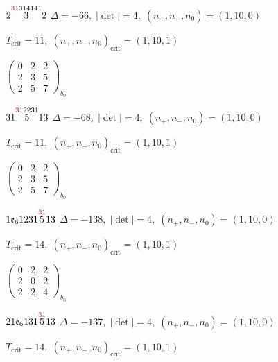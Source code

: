 \documentclass[10pt]{article}
\begin{document}
\smallskip

$2\overset{\textcolor{red}{3}1314141}{3}2$ \quad $\Delta=-66,\; |\det|=4,\; (n_+,n_-,n_0)=(1,10,0)$

\hspace{1em}$T_{\text{crit}}=11,\; (n_+,n_-,n_0)_{\text{crit}}=(1,10,1)$

\hspace{2em}$\left(\begin{smallmatrix}0 & 2 & 2 \\ 2 & 3 & 5 \\ 2 & 5 & 7\end{smallmatrix}\right)_{\!b_0}$

\smallskip

$31\overset{\textcolor{red}{3}12231}{5}13$ \quad $\Delta=-68,\; |\det|=4,\; (n_+,n_-,n_0)=(1,10,0)$

\hspace{1em}$T_{\text{crit}}=11,\; (n_+,n_-,n_0)_{\text{crit}}=(1,10,1)$

\hspace{2em}$\left(\begin{smallmatrix}0 & 2 & 2 \\ 2 & 3 & 5 \\ 2 & 5 & 7\end{smallmatrix}\right)_{\!b_0}$

\smallskip

$1\mathfrak{e}_61231\overset{\textcolor{red}{3}1}{5}13$ \quad $\Delta=-138,\; |\det|=4,\; (n_+,n_-,n_0)=(1,10,0)$

\hspace{1em}$T_{\text{crit}}=14,\; (n_+,n_-,n_0)_{\text{crit}}=(1,10,1)$

\hspace{2em}$\left(\begin{smallmatrix}0 & 2 & 2 \\ 2 & 0 & 2 \\ 2 & 2 & 4\end{smallmatrix}\right)_{\!b_0}$

\smallskip

$21\mathfrak{e}_6131\overset{\textcolor{red}{3}1}{5}13$ \quad $\Delta=-137,\; |\det|=4,\; (n_+,n_-,n_0)=(1,10,0)$

\hspace{1em}$T_{\text{crit}}=14,\; (n_+,n_-,n_0)_{\text{crit}}=(1,10,1)$
\end{document}

